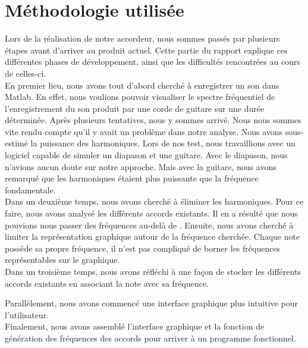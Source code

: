 \section{Méthodologie utilisée}
Lors de la réalisation de notre accordeur, nous sommes passés par plusieurs étapes avant d'arriver au produit actuel. Cette partie du rapport explique ces différentes phases de développement, ainsi que les difficultés rencontrées au cours de celles-ci.\\

En premier lieu, nous avons tout d'abord cherché à enregistrer un son dans Matlab. En effet, nous voulions pouvoir visualiser le spectre fréquentiel de l'enregistrement du son produit par une corde de guitare sur une durée déterminée.
Après plusieurs tentatives, nous y sommes arrivé.
Nous nous sommes vite rendu compte qu'il y avait un problème dans notre analyse.
Nous avons sous-estimé la puissance des harmoniques.
Lors de nos test, nous travaillions avec un logiciel capable de simuler un diapason et une guitare.
Avec le diapason, nous n'avions aucun doute sur notre approche.
Mais avec la guitare, nous avons remarqué que les harmoniques étaient plus puissante que la fréquence fondamentale.\\

Dans un deuxième temps, nous avons cherché à éliminer les harmoniques.
Pour ce faire, nous avons analysé les différents accords existants.
Il en a résulté que nous pouvions nous passer des fréquences au-delà de .
Ensuite, nous avons cherché à limiter la représentation graphique autour de la fréquence cherchée.
Chaque note possède sa propre fréquence, il n'est pas compliqué de borner les fréquences représentables sur le graphique.\\

Dans un troisième temps, nous avons réfléchi à une façon de stocker les différents accords existants en associant la note avec sa fréquence.

Parallèlement, nous avons commencé une interface graphique plus intuitive pour l'utilisateur.\\

Finalement, nous avons assemblé l'interface graphique et la fonction de génération des fréquences des accords pour arriver à un programme fonctionnel.



